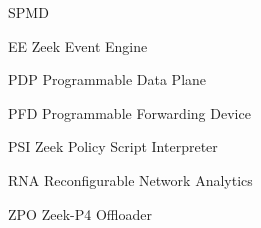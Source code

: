 
\begin{listofabbrv}{SPMD}
    \item[EE]  Zeek Event Engine
    \item[PDP] Programmable Data Plane
    \item[PFD] Programmable Forwarding Device
    \item[PSI] Zeek Policy Script Interpreter
    \item[RNA] Reconfigurable Network Analytics
    \item[ZPO] Zeek-P4 Offloader
\end{listofabbrv}
